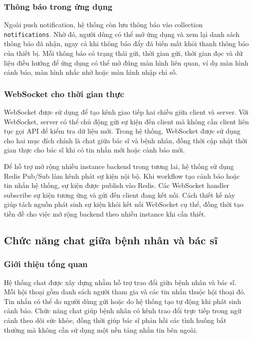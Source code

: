 \subsubsection{Thông báo trong ứng dụng}
\par Ngoài push notification, hệ thống còn lưu thông báo vào collection \texttt{notifications}. Nhờ đó, người dùng có thể mở ứng dụng và xem lại danh sách thông báo đã nhận, ngay cả khi thông báo đẩy đã biến mất khỏi thanh thông báo của thiết bị. Mỗi thông báo có trạng thái gửi, thời gian gửi, thời gian đọc và dữ liệu điều hướng để ứng dụng có thể mở đúng màn hình liên quan, ví dụ màn hình cảnh báo, màn hình nhắc nhở hoặc màn hình nhập chỉ số.

\subsubsection{WebSocket cho thời gian thực}
\par WebSocket được sử dụng để tạo kênh giao tiếp hai chiều giữa client và server. Với WebSocket, server có thể chủ động gửi sự kiện đến client mà không cần client liên tục gọi API để kiểm tra dữ liệu mới. Trong hệ thống, WebSocket được sử dụng cho hai mục đích chính là chat giữa bác sĩ và bệnh nhân, đồng thời cập nhật thời gian thực cho bác sĩ khi có tin nhắn mới hoặc cảnh báo mới. \cite{websocketmdn}

\par Để hỗ trợ mở rộng nhiều instance backend trong tương lai, hệ thống sử dụng Redis Pub/Sub làm kênh phát sự kiện nội bộ. Khi workflow tạo cảnh báo hoặc tin nhắn hệ thống, sự kiện được publish vào Redis. Các WebSocket handler subscribe sự kiện tương ứng và gửi đến client đang kết nối. Cách thiết kế này giúp tách nguồn phát sinh sự kiện khỏi kết nối WebSocket cụ thể, đồng thời tạo tiền đề cho việc mở rộng backend theo nhiều instance khi cần thiết.

\subsection{Chức năng chat giữa bệnh nhân và bác sĩ}

\subsubsection{Giới thiệu tổng quan}
\par Hệ thống chat được xây dựng nhằm hỗ trợ trao đổi giữa bệnh nhân và bác sĩ. Mỗi hội thoại gồm danh sách người tham gia và các tin nhắn thuộc hội thoại đó. Tin nhắn có thể do người dùng gửi hoặc do hệ thống tạo tự động khi phát sinh cảnh báo. Chức năng chat giúp bệnh nhân có kênh trao đổi trực tiếp trong ngữ cảnh theo dõi sức khỏe, đồng thời giúp bác sĩ phản hồi các tình huống bất thường mà không cần sử dụng một nền tảng nhắn tin bên ngoài.

